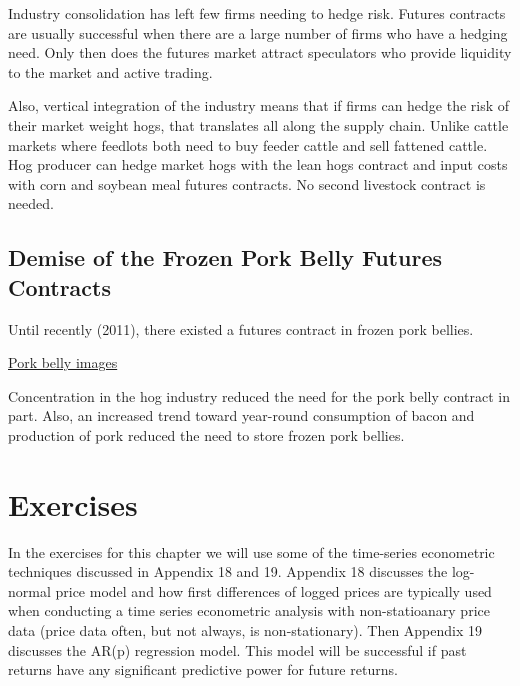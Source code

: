\documentclass[
  letterpaper,
  DIV=11,
  numbers=noendperiod]{scrreprt}
\begin{document}
Industry consolidation has left few firms needing to hedge risk. Futures
contracts are usually successful when there are a large number of firms
who have a hedging need. Only then does the futures market attract
speculators who provide liquidity to the market and active trading.

Also, vertical integration of the industry means that if firms can hedge
the risk of their market weight hogs, that translates all along the
supply chain. Unlike cattle markets where feedlots both need to buy
feeder cattle and sell fattened cattle. Hog producer can hedge market
hogs with the lean hogs contract and input costs with corn and soybean
meal futures contracts. No second livestock contract is needed.

\hypertarget{demise-of-the-frozen-pork-belly-futures-contracts}{%
\subsection{Demise of the Frozen Pork Belly Futures
Contracts}\label{demise-of-the-frozen-pork-belly-futures-contracts}}

Until recently (2011), there existed a futures contract in frozen pork
bellies.

\href{https://www.google.com/search?q=pork+belly\&biw=1920\&bih=1075\&noj=1\&source=lnms\&tbm=isch\&sa=X\&ved=0CAgQ_AUoAmoVChMIhbO55IqdyQIVDNUeCh0_owNp}{Pork
belly images}

Concentration in the hog industry reduced the need for the pork belly
contract in part. Also, an increased trend toward year-round consumption
of bacon and production of pork reduced the need to store frozen pork
bellies.

\hypertarget{exercises-7}{%
\section{Exercises}\label{exercises-7}}

In the exercises for this chapter we will use some of the time-series
econometric techniques discussed in Appendix 18 and 19. Appendix 18
discusses the log-normal price model and how first differences of logged
prices are typically used when conducting a time series econometric
analysis with non-statioanary price data (price data often, but not
always, is non-stationary). Then Appendix 19 discusses the AR(p)
regression model. This model will be successful if past returns have any
significant predictive power for future returns.
\end{document}
